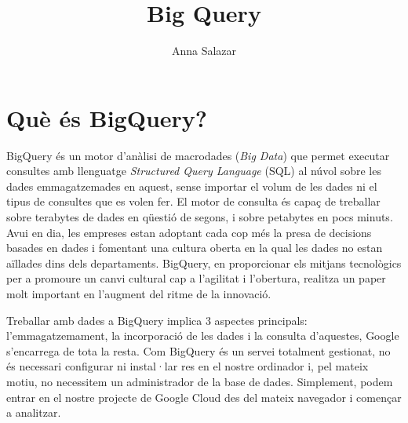 \documentclass[12pt,longbibliography]{article}
\title{Big Query}
\author{Anna Salazar}
\theoremstyle{definition}
\theoremstyle{remark}
\begin{document}
\begin{titlepage}

\maketitle

\vspace{140mm}

\par
{}%
\hfill
{}%
\par

\end{titlepage}

\tableofcontents

\pagebreak


\section{Què és BigQuery?}

BigQuery és un motor d’anàlisi de macrodades (\textit{Big Data}) que permet executar consultes amb llenguatge \emph{Structured Query Language} (SQL) al núvol sobre les dades emmagatzemades en aquest, sense importar el volum de les dades ni el tipus de consultes que es volen fer. El motor de consulta és capaç de treballar sobre terabytes de dades en qüestió de segons, i sobre petabytes en pocs minuts. Avui en dia, les empreses estan adoptant cada cop més la presa de decisions basades en dades i fomentant una cultura oberta en la qual les dades no estan aïllades dins dels departaments. BigQuery, en proporcionar els mitjans tecnològics per a promoure un canvi cultural cap a l’agilitat i l’obertura, realitza un paper molt important en l’augment del ritme de la innovació.


Treballar amb dades a BigQuery implica 3 aspectes principals: l’emmagatzemament, la incorporació de les dades i la consulta d’aquestes, Google s’encarrega de tota la resta. Com BigQuery és un servei totalment gestionat, no és necessari configurar ni instal·lar res en el nostre ordinador i, pel mateix motiu, no necessitem un administrador de la base de dades. Simplement, podem entrar en el nostre projecte de Google Cloud des del mateix navegador i començar a analitzar.
\end{document}

